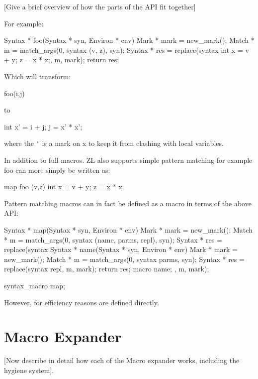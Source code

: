 \documentclass[12pt,english,letterpaper]{article}
\begin{document}
[Give a brief overview of how the parts of the API fit together]

For example:
\begin{code}
Syntax * foo(Syntax * syn, Environ * env) {
  Mark * mark = new_mark();
  Match * m = match_args(0, syntax (v, z), syn);
  Syntax * res = replace(syntax {int x = v + y; z = x * x;}, m, mark);
  return res;
}
\end{code}

Which will transform:
\begin{code}
foo(i,j)
\end{code}
to
\begin{code}
int x' = i + j;
j = x' * x';
\end{code}
where the \verb/'/ is a mark on x to keep it from clashing with local variables.

In addition to full macros. ZL also supports simple pattern matching
for example foo can more simply be written as:

\begin{code}
map foo (v,z) {
  int x = v + y; 
  z = x * x;
}
\end{code}

Pattern matching macros can in fact be defined as a macro in terms of
the above API:

\begin{code}
Syntax * map(Syntax * syn, Environ * env) {
  Mark * mark = new_mark();
  Match * m = match_args(0, syntax (name, parms, repl), syn);
  Syntax * res = replace(syntax {
      Syntax * name(Syntax * syn, Environ * env) {
        Mark * mark = new_mark();
        Match * m = match_args(0, syntax parms, syn);
        Syntax * res = replace(syntax repl, m, mark);
        return res;
      }
      macro name;
    }, m, mark);
}

syntax_macro map;
\end{code}

However, for efficiency reasons are defined directly.

\section{Macro Expander}

[Now describe in detail how each of the Macro expander works,
  including the hygiene system].
\end{document}
